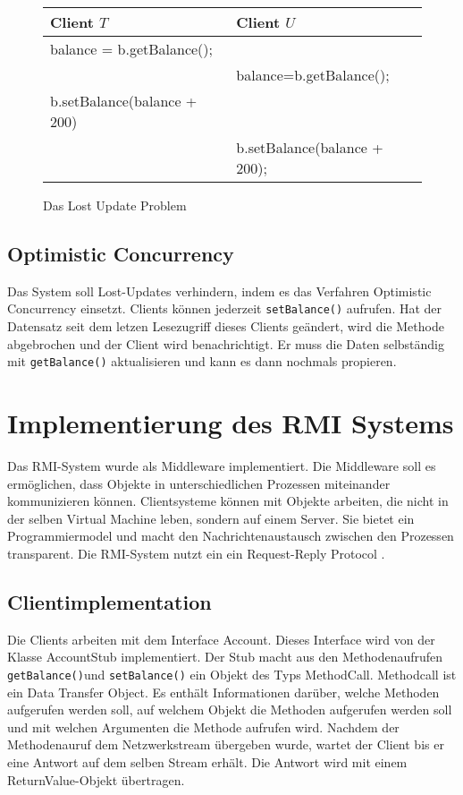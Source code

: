 \begin{figure}[h]
  \centering

\begin{tabular}{l | l}
  \textbf{Client $T$} & \textbf{Client $U$} \\ \hline
balance = b.getBalance(); &  \\
 & balance=b.getBalance();  \\
b.setBalance(balance + 200) & \\
& b.setBalance(balance + 200);  \\ \hline
\end{tabular}
    
  \caption{Das Lost Update Problem}
  \label{fig:lostupdate}
\end{figure}

\subsection{Optimistic Concurrency}
\label{sec:optim-conc}

Das System soll Lost-Updates verhindern, indem es das Verfahren
Optimistic Concurrency \cite{wiki:optimistic-concurrency} einsetzt. Clients
können jederzeit \verb|setBalance()| aufrufen. Hat der Datensatz seit
dem letzen Lesezugriff dieses Clients geändert, wird die Methode
abgebrochen und der Client wird benachrichtigt. Er muss die Daten
selbständig mit \verb|getBalance()| aktualisieren und kann es dann
nochmals propieren.

\section{Implementierung des RMI Systems}
\label{sec:impl-des-eigen}

Das RMI-System wurde als Middleware implementiert. Die Middleware soll es
ermöglichen, dass Objekte in unterschiedlichen Prozessen miteinander kommunizieren können. Clientsysteme können mit Objekte arbeiten, die\-
nicht in der selben Virtual Machine leben, sondern auf einem Server. Sie bietet ein Programmiermodel
und macht den Nachrichtenaustausch zwischen den Prozessen
transparent. Die RMI-System nutzt ein ein Request-Reply Protocol \cite{coulouris88}.

\subsection{Clientimplementation}
\label{sec:clientimplementation}

Die Clients arbeiten mit dem Interface Account. Dieses Interface wird
von der Klasse AccountStub implementiert. Der Stub macht aus den
Methodenaufrufen
\verb|getBalance()|und \verb|setBalance()| ein Objekt des Typs
MethodCall. Methodcall ist ein Data Transfer Object. Es enthält
Informationen darüber, welche Methoden aufgerufen werden soll, auf
welchem Objekt die Methoden aufgerufen werden soll und mit welchen
Argumenten die Methode aufrufen wird. Nachdem der Methodenauruf dem
Netzwerkstream übergeben wurde, wartet der Client bis er eine Antwort
auf dem selben Stream erhält. Die Antwort wird mit einem
ReturnValue-Objekt übertragen.

